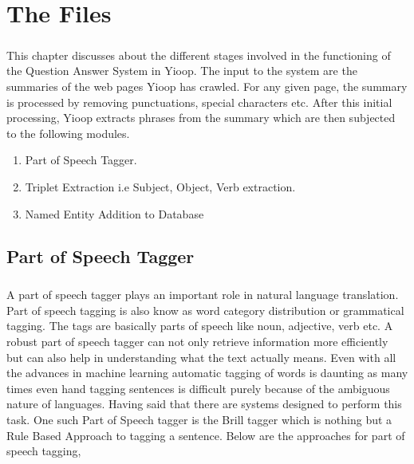 \chapter{The Files}

\paragraph{}
This chapter discusses about the different stages involved in the functioning of the  Question Answer System in Yioop. The input to the system are the summaries of the web pages Yioop has crawled. For any given page, the summary is processed  by removing punctuations, special characters etc. After this initial processing, Yioop extracts phrases from the summary which are then subjected to the following modules.

\begin{enumerate} 
\item Part of Speech Tagger.
\item Triplet Extraction i.e Subject, Object, Verb extraction.
\item Named Entity Addition to Database
\end{enumerate}

\section{Part of Speech Tagger}
\paragraph{}
A part of speech tagger plays an important role in natural language translation. Part of speech tagging is also know as word category distribution or grammatical tagging. The tags are basically parts of speech like noun, adjective, verb etc.   A robust part of speech tagger  can not only retrieve information more efficiently but can also help in understanding what the text actually means. Even with all the advances in machine learning automatic tagging of words  is daunting as many times even hand tagging sentences is difficult purely because of the ambiguous nature of languages. Having said that there are systems designed to perform this task. One such Part of Speech tagger is the Brill tagger which is nothing but a Rule Based Approach to tagging a sentence. Below are the approaches for part of speech tagging, 

